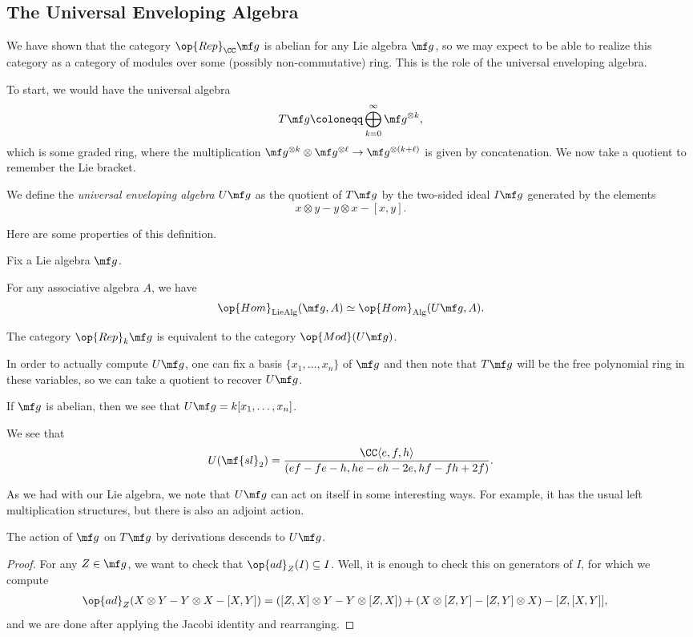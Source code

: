 \documentclass[../notes.tex]{subfiles}
\begin{document}
\subsection{The Universal Enveloping Algebra}
We have shown that the category $\op{Rep}_\CC\mf g$ is abelian for any Lie algebra $\mf g$, so we may expect to be able to realize this category as a category of modules over some (possibly non-commutative) ring. This is the role of the universal enveloping algebra.

To start, we would have the universal algebra
\[T\mf g\coloneqq\bigoplus_{k=0}^\infty\mf g^{\otimes k},\]
which is some graded ring, where the multiplication $\mf g^{\otimes k}\otimes\mf g^{\otimes\ell}\to\mf g^{\otimes(k+\ell)}$ is given by concatenation. We now take a quotient to remember the Lie bracket.
\begin{definition}
	We define the \textit{universal enveloping algebra} $U\mf g$ as the quotient of $T\mf g$ by the two-sided ideal $I\mf g$ generated by the elements
	\[x\otimes y-y\otimes x-[x,y].\]
\end{definition}
Here are some properties of this definition.
\begin{proposition}
	Fix a Lie algebra $\mf g$.
	\begin{listalph}
		\item For any associative algebra $A$, we have
		\[\op{Hom}_{\mathrm{LieAlg}}(\mf g,A)\simeq\op{Hom}_{\mathrm{Alg}}(U\mf g,A).\]
		\item The category $\op{Rep}_k\mf g$ is equivalent to the category $\op{Mod}(U\mf g)$.
	\end{listalph}
\end{proposition}
In order to actually compute $U\mf g$, one can fix a basis $\{x_1,\ldots,x_n\}$ of $\mf g$ and then note that $T\mf g$ will be the free polynomial ring in these variables, so we can take a quotient to recover $U\mf g$.
\begin{example}
	If $\mf g$ is abelian, then we see that $U\mf g=k[x_1,\ldots,x_n]$.
\end{example}
\begin{example}
	We see that
	\[U(\mf{sl}_2)=\frac{\CC\langle e,f,h\rangle}{(ef-fe-h,he-eh-2e,hf-fh+2f)}.\]
\end{example}
As we had with our Lie algebra, we note that $U\mf g$ can act on itself in some interesting ways. For example, it has the usual left multiplication structures, but there is also an adjoint action.
\begin{lemma}
	The action of $\mf g$ on $T\mf g$ by derivations descends to $U\mf g$.
\end{lemma}
\begin{proof}
	For any $Z\in\mf g$, we want to check that $\op{ad}_Z(I)\subseteq I$. Well, it is enough to check this on generators of $I$, for which we compute
	\begin{align*}
		\op{ad}_Z(X\otimes Y-Y\otimes X-[X,Y]) &= ([Z,X]\otimes Y-Y\otimes[Z,X])+(X\otimes[Z,Y]-[Z,Y]\otimes X)-[Z,[X,Y]],
	\end{align*}
	and we are done after applying the Jacobi identity and rearranging.
\end{proof}
\end{document}
